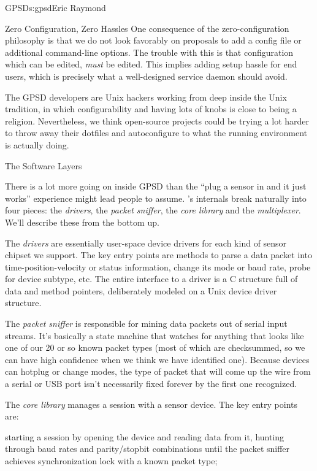 \begin{aosachapter}{GPSD}{s:gpsd}{Eric Raymond}
\begin{aosasect1}{Zero Configuration, Zero Hassles}
One consequence of the zero-configuration philosophy is that we do not
look favorably on proposals to add a config file or additional
command-line options.  The trouble with this is that configuration
which can be edited, \emph{must} be edited.  This implies adding setup
hassle for end users, which is precisely what a well-designed service
daemon should avoid.

The GPSD developers are Unix hackers working from deep inside the
Unix tradition, in which configurability and having lots of knobs
is close to being a religion.  Nevertheless, we think open-source
projects could be trying a lot harder to throw away their dotfiles
and autoconfigure to what the running environment is actually doing.

\end{aosasect1}

\begin{aosasect1}{The Software Layers}

There is a lot more going on inside GPSD than the ``plug a sensor in
and it just works'' experience might lead people to assume.
's internals break naturally into four pieces: the
\emph{drivers}, the \emph{packet sniffer}, the \emph{core library} and
the \emph{multiplexer}. We'll describe these from the bottom up.

The \emph{drivers} are essentially user-space device drivers for each
kind of sensor chipset we support.  The key entry points are methods
to parse a data packet into time-position-velocity or status
information, change its mode or baud rate, probe for device subtype,
etc.  The entire interface to a driver is a C structure full of data
and method pointers, deliberately modeled on a Unix device driver
structure.

The \emph{packet sniffer} is responsible for mining data packets out
of serial input streams.  It's basically a state machine that watches
for anything that looks like one of our 20 or so known packet types
(most of which are checksummed, so we can have high confidence when we
think we have identified one).  Because devices can hotplug or change
modes, the type of packet that will come up the wire from a serial or
USB port isn't necessarily fixed forever by the first one recognized.

The \emph{core library} manages a session with a sensor device.  The
key entry points are:

\begin{aosaitemize}

  \item starting a session by opening the device and reading data from
    it, hunting through baud rates and parity/stopbit combinations
    until the packet sniffer achieves synchronization lock with a
    known packet type;


\end{aosaitemize}
\end{aosasect1}
\end{aosachapter}
